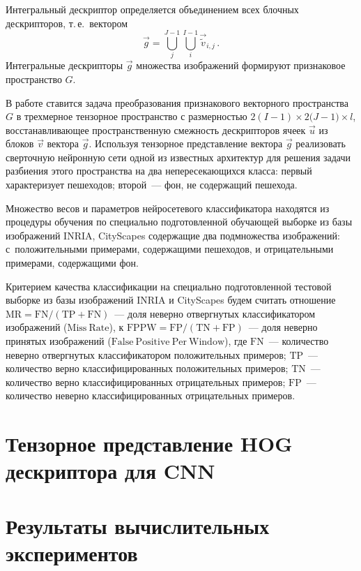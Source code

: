 \documentclass[12pt,twoside]{article}
\begin{document}
Интегральный дескриптор определяется объединением всех
блочных дескрипторов, т.\,е.\ вектором
\begin{equation}
\vec {g}=\bigcup_j^{J-1}{\bigcup_i^{I-1}{\vec{\tilde{v}}_{i,j}}}\,.
\end{equation}
Интегральные дескрипторы $\vec{g}$ множества изображений формируют
признаковое пространство $G$. 

В работе ставится задача преобразования признакового векторного пространства $G$ в трехмерное тензорное пространство с размерностью ${2(I-1)}\times{2(J-1})\times{l}$, восстанавливающее пространственную смежность дескрипторов ячеек $\vec{u}$ из блоков $\vec{v}$ вектора $\vec{g}$. Используя тензорное представление вектора $\vec{g}$ реализовать сверточную нейронную сети одной из известных архитектур для решения задачи разбиения этого пространства
на два непересекающихся класса: первый характеризует пешеходов; второй~--- фон, не содержащий пешехода. 

Множество весов и параметров нейросетевого классификатора находятся из процедуры обучения по специально подготовленной 
обучающей выборке из базы изображений INRIA, CityScapes \cite{inria} содержащие два подмножества изображений: 
с~положительными примерами, содержащими пешеходов, и отрицательными примерами, содержащими фон.

	Критерием качества классификации  на специально
	подготовленной тестовой выборке из базы изображений INRIA \cite{inria} и CityScapes
	будем считать отношение $\mathrm{MR} = \mathrm{FN}/(\mathrm{TP}+\mathrm{FN})$~---
	доля неверно отвергнутых классификатором изображений ($\mathrm{Miss\ Rate}$),
	к $\mathrm{FPPW} = \mathrm{FP}/(\mathrm{TN}+\mathrm{FP})$~---
	доля неверно принятых изображений ($\mathrm{False\ Positive\ Per\
	Window}$), где $\mathrm{FN}$~--- количество неверно отвергнутых
	классификатором положительных примеров; $\mathrm{TP}$~---
	количество верно классифицированных положительных примеров;
	$\mathrm{TN}$~--- количество верно классифицированных отрицательных
	примеров; $\mathrm{FP}$~--- количество неверно классифицированных отрицательных примеров.


\section{Тензорное представление HOG дескриптора для CNN}


\section{Результаты вычислительных экспериментов}
\end{document}
